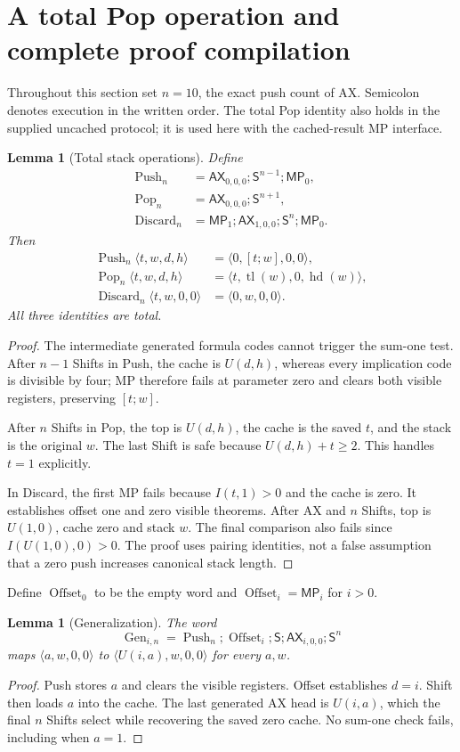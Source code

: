 \documentclass[11pt]{article}
\newtheorem{lemma}[theorem]{Lemma}
\newcommand{\AX}{\mathsf{AX}}
\newcommand{\MP}{\mathsf{MP}}
\newcommand{\Shift}{\mathsf{S}}
\newcommand{\hd}{\operatorname{hd}}
\newcommand{\tl}{\operatorname{tl}}
\newcommand{\st}[4]{\langle #1,#2,#3,#4\rangle}
\newcommand{\Push}{\operatorname{Push}}
\newcommand{\Pop}{\operatorname{Pop}}
\newcommand{\Discard}{\operatorname{Discard}}
\newcommand{\Gen}{\operatorname{Gen}}
\begin{document}
\section{A total Pop operation and complete proof compilation}

Throughout this section set $n=10$, the exact push count of AX. Semicolon denotes execution in the written order. The total Pop identity also holds in the supplied uncached protocol; it is used here with the cached-result MP interface.

\begin{lemma}[Total stack operations]
Define
\begin{align*}
 \Push_n&=\AX_{0,0,0};\Shift^{n-1};\MP_0,\\
 \Pop_n&=\AX_{0,0,0};\Shift^{n+1},\\
 \Discard_n&=\MP_1;\AX_{1,0,0};\Shift^n;\MP_0.
\end{align*}
Then
\begin{align*}
 \Push_n\st{t}{w}{d}{h}&=\st{0}{[t;w]}{0}{0},\\
 \Pop_n\st{t}{w}{d}{h}&=\st{t}{\tl(w)}{0}{\hd(w)},\\
 \Discard_n\st{t}{w}{0}{0}&=\st{0}{w}{0}{0}.
\end{align*}
All three identities are total.
\end{lemma}
\begin{proof}
The intermediate generated formula codes cannot trigger the sum-one test. After $n-1$ Shifts in Push, the cache is $U(d,h)$, whereas every implication code is divisible by four; MP therefore fails at parameter zero and clears both visible registers, preserving $[t;w]$.

After $n$ Shifts in Pop, the top is $U(d,h)$, the cache is the saved $t$, and the stack is the original $w$. The last Shift is safe because $U(d,h)+t\ge2$. This handles $t=1$ explicitly.

In Discard, the first MP fails because $I(t,1)>0$ and the cache is zero. It establishes offset one and zero visible theorems. After AX and $n$ Shifts, top is $U(1,0)$, cache zero and stack $w$. The final comparison also fails since $I(U(1,0),0)>0$.
The proof uses pairing identities, not a false assumption that a zero push increases canonical stack length.
\end{proof}

Define $\operatorname{Offset}_0$ to be the empty word and
$\operatorname{Offset}_i=\MP_i$ for $i>0$.
\begin{lemma}[Generalization]
The word
\[
 \Gen_{i,n}=\Push_n;\operatorname{Offset}_i;\Shift;\AX_{i,0,0};\Shift^n
\]
maps $\st{a}{w}{0}{0}$ to $\st{U(i,a)}{w}{0}{0}$ for every $a,w$.
\end{lemma}
\begin{proof}
Push stores $a$ and clears the visible registers. Offset establishes $d=i$. Shift then loads $a$ into the cache. The last generated AX head is $U(i,a)$, which the final $n$ Shifts select while recovering the saved zero cache. No sum-one check fails, including when $a=1$.
\end{proof}
\end{document}
